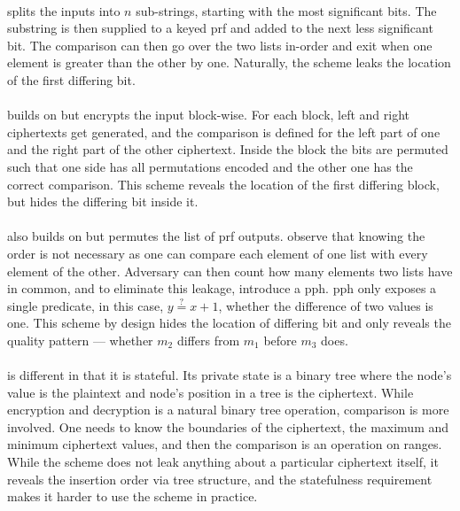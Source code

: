 		\paragraph*{\cite{practical-ore}} splits the inputs into $n$ sub-strings, starting with the most significant bits.
		The substring is then supplied to a keyed \gls{prf} and added to the next less significant bit.
		The comparison can then go over the two lists in-order and exit when one element is greater than the other by one.
		Naturally, the scheme leaks the location of the first differing bit.

		\paragraph*{\cite{lewi-wu-ore}} builds on \cite{practical-ore} but encrypts the input block-wise.
		For each block, left and right ciphertexts get generated, and the comparison is defined for the left part of one and the right part of the other ciphertext.
		Inside the block the bits are permuted such that one side has all permutations encoded and the other one has the correct comparison.
		This scheme reveals the location of the first differing block, but hides the differing bit inside it.

		\paragraph*{\cite{adam-ore-v2}} also builds on \cite{practical-ore} but permutes the list of \gls{prf} outputs.
		\textcite{adam-ore-v2} observe that knowing the order is not necessary as one can compare each element of one list with every element of the other.
		Adversary can then count how many elements two lists have in common, and to eliminate this leakage, \textcite{adam-ore-v2} introduce a \gls{pph}.
		\gls{pph} only exposes a single predicate, in this case, $y \overset{?}{=} x + 1$, whether the difference of two values is one.
		This scheme by design hides the location of differing bit and  only reveals the quality pattern --- whether $m_2$ differs from $m_1$ before $m_3$ does.

		\paragraph*{\cite{fh-ope}} is different in that it is stateful.
		Its private state is a binary tree where the node's value is the plaintext and node's position in a tree is the ciphertext.
		While encryption and decryption is a natural binary tree operation, comparison is more involved.
		One needs to know the boundaries of the ciphertext, the maximum and minimum ciphertext values, and then the comparison is an operation on ranges.
		While the scheme does not leak anything about a particular ciphertext itself, it reveals the insertion order via tree structure, and the statefulness requirement makes it harder to use the scheme in practice.

